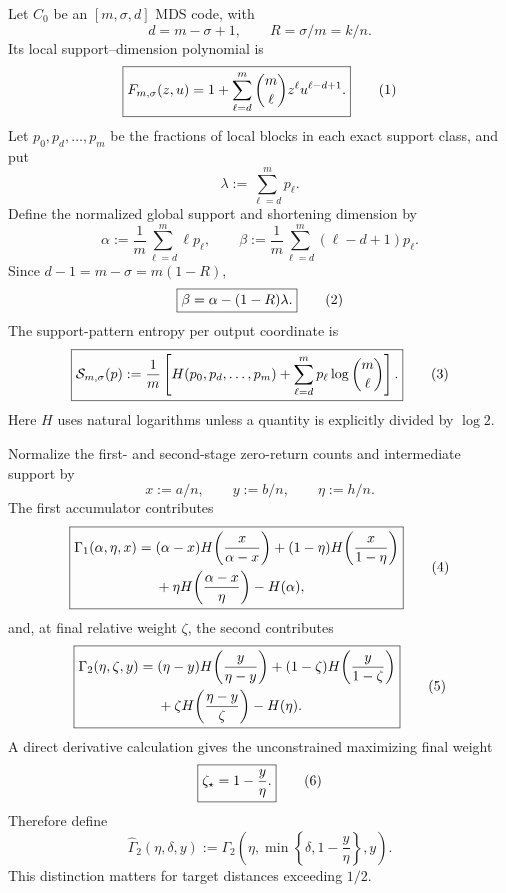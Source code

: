 Let $C_0$ be an $[m,\sigma,d]$ MDS code, with
\[
    d=m-\sigma+1,
    \qquad R=\sigma/m=k/n.
\]
Its local support--dimension polynomial is
\[
    \boxed{
    F_{m,\sigma}(z,u)
      =
    1+
    \sum_{\ell=d}^{m}
    \binom{m}{\ell}z^\ell u^{\ell-d+1}.
    }
    \eqnumlabel{eq:L1}
\]
Let $p_0,p_d,\ldots,p_m$ be the fractions of local blocks in each exact
support class, and put
\[
    \lambda:=\sum_{\ell=d}^{m}p_\ell.
\]
Define the normalized global support and shortening dimension by
\[
    \alpha
      :=
    \frac1m\sum_{\ell=d}^{m}\ell p_\ell,
    \qquad
    \beta
      :=
    \frac1m\sum_{\ell=d}^{m}(\ell-d+1)p_\ell.
\]
Since $d-1=m-\sigma=m(1-R)$,
\[
    \boxed{
    \beta=\alpha-(1-R)\lambda.
    }
    \eqnumlabel{eq:L2}
\]
The support-pattern entropy per output coordinate is
\[
    \boxed{
    \cS_{m,\sigma}(p)
      :=
    \frac1m
    \left[
      H(p_0,p_d,\ldots,p_m)
      +
      \sum_{\ell=d}^{m}p_\ell\log\binom{m}{\ell}
    \right].
    }
    \eqnumlabel{eq:L3}
\]
Here $H$ uses natural logarithms unless a quantity is explicitly divided by
$\log 2$.

Normalize the first- and second-stage zero-return counts and intermediate
support by
\[
    x:=a/n,
    \qquad
    y:=b/n,
    \qquad
    \eta:=h/n.
\]
The first accumulator contributes
\[
\boxed{
\begin{aligned}
\Gamma_1(\alpha,\eta,x)
={}&
(\alpha-x)
H\!\left(\frac{x}{\alpha-x}\right)
+
(1-\eta)
H\!\left(\frac{x}{1-\eta}\right)
\\
&+
\eta
H\!\left(\frac{\alpha-x}{\eta}\right)
-H(\alpha),
\end{aligned}
}
\eqnumlabel{eq:L4}
\]
and, at final relative weight $\zeta$, the second contributes
\[
\boxed{
\begin{aligned}
\Gamma_2(\eta,\zeta,y)
={}&
(\eta-y)
H\!\left(\frac{y}{\eta-y}\right)
+
(1-\zeta)
H\!\left(\frac{y}{1-\zeta}\right)
\\
&+
\zeta
H\!\left(\frac{\eta-y}{\zeta}\right)
-H(\eta).
\end{aligned}
}
\eqnumlabel{eq:L5}
\]
A direct derivative calculation gives the unconstrained maximizing final weight
\[
    \boxed{
    \zeta_\star=1-\frac{y}{\eta}.
    }
    \eqnumlabel{eq:L6}
\]
Therefore define
\[
    \widehat\Gamma_2(\eta,\delta,y)
      :=
    \Gamma_2\!\left(
      \eta,
      \min\left\{\delta,1-\frac{y}{\eta}\right\},
      y
    \right).
\]
This distinction matters for target distances exceeding $1/2$.

